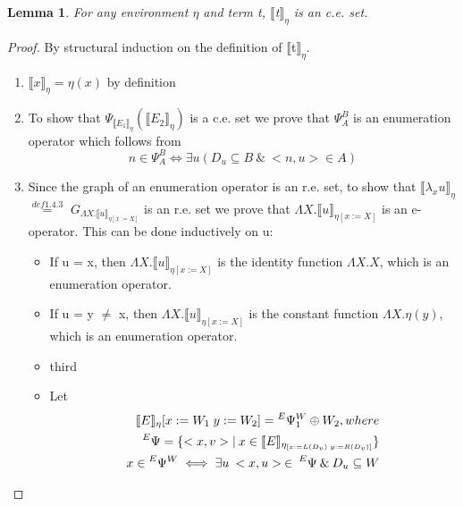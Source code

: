 \documentclass{article}
\newtheorem{lemma}[theorem]{Lemma} %
\begin{document}
	\begin{lemma}
		For any environment $\eta$ and term t, 
			$\llbracket$t$\rrbracket_\eta$ is an c.e. set.
	\end{lemma}
	\begin{proof}
		By structural induction on the definition of 
			$\llbracket$t$\rrbracket_\eta$.
		\begin{enumerate}
			\item 
				$\llbracket x \rrbracket_\eta = \eta (x)$ by definition
			\item
				To show that $\Psi_{\llbracket E_1 \rrbracket_\eta} 
				(\llbracket E_2 \rrbracket_\eta)$ is a c.e. set we
				prove that $\Psi^B_A$ is an enumeration operator which 
				follows from 
				\begin{equation} 
					n \in \Psi^B_A \iff \exists u (D_u \subseteq B 
					\:\&\: <n, u> \in A)
				\end{equation}
			\item
				Since the graph of an enumeration operator is an r.e.
				set, to show that 
				$\llbracket \lambda_x u \rrbracket_\eta$ 
				$\stackrel{def 1.4.3}{=}$ 
				$G_{\Lambda X. \llbracket u \rrbracket_{\eta [x := X]}}$
				is an r.e. set we prove that
				$\Lambda X. \llbracket u \rrbracket_{\eta [x := X]}$
				is an e-operator. This can be done inductively on u:
				\begin{itemize}
  				\item If u = x, then 
					$\Lambda X. \llbracket u \rrbracket_{\eta [x := X]}$
					is the identity function $\Lambda X. X$, which is 
					an enumeration operator.
  				\item If u = y $\neq$ x, then 
					$\Lambda X. \llbracket u \rrbracket_{\eta [x := X]}$
					is the constant function $\Lambda X. \eta(y)$, which
					is an enumeration operator.
  				\item third
  				\item Let 
				\begin{equation*}
				\begin{split}
					\llbracket E \rrbracket_\eta[x := W_1\; y := W_2]
					= \prescript{E}{}{\Psi}{}{}^W_1 \oplus W_2, where\\
					\prescript{E}{}{\Psi}{}{} = \{<x, v> |\:x \in 
					\llbracket E \rrbracket_{\eta_{
					[x := L(D_v)\; y := R(D_v)]}}\}\\
					x \in \prescript{E}{}{\Psi}{}{}^W \iff \exists u \: 
					<x, u>\:\in\:\prescript{E}{}{\Psi}{}{}\:\&\: 
					D_u \subseteq W
				\end{split}

\end{equation*}
\end{itemize}
\end{enumerate}
\end{proof}
\end{document}

